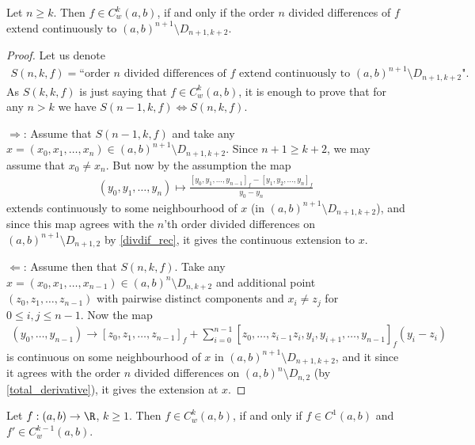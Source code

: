 \begin{lem}\label{weaklyCk_basic}
	Let $n \geq k$. Then $f \in C_{w}^{k}(a, b)$, if and only if the order $n$ divided differences of $f$ extend continuously to $(a, b)^{n + 1} \setminus D_{n + 1, k + 2}$.
\end{lem}
\begin{proof}
	Let us denote
	\begin{align*}
		S(n, k, f) = \text{``order $n$ divided differences of $f$ extend continuously to $(a, b)^{n + 1} \setminus D_{n + 1, k + 2}$"}.
	\end{align*}
	As $S(k, k, f)$ is just saying that $f \in C_{w}^{k}(a, b)$, it is enough to prove that for any $n > k$ we have $S(n - 1, k, f) \Leftrightarrow S(n, k, f)$.

	$\Rightarrow$: Assume that $S(n - 1, k, f)$ and take any $x = (x_{0}, x_{1}, \ldots, x_{n}) \in (a, b)^{n + 1} \setminus D_{n + 1, k + 2}$. Since $n + 1 \geq k + 2$, we may assume that $x_{0} \neq x_{n}$. But now by the assumption the map
	\begin{align*}
		(y_{0}, y_{1}, \ldots, y_{n}) \mapsto \frac{[y_{0}, y_{1}, \ldots, y_{n - 1}]_{f} - [y_{1}, y_{2}, \ldots, y_{n}]_{f}}{y_{0} - y_{n}}
	\end{align*}
	extends continuously to some neighbourhood of $x$ (in $(a, b)^{n + 1} \setminus D_{n + 1, k + 2}$), and since this map agrees with the $n$'th order divided differences on $(a, b)^{n + 1} \setminus D_{n + 1, 2}$ by \ref{divdif_rec}, it gives the continuous extension to $x$.

	$\Leftarrow$: Assume then that $S(n, k, f)$. Take any $x = (x_{0}, x_{1}, \ldots, x_{n - 1}) \in (a, b)^{n} \setminus D_{n, k + 2}$ and additional point $(z_{0}, z_{1}, \ldots, z_{n - 1})$ with pairwise distinct components and $x_{i} \neq z_{j}$ for $0 \leq i, j \leq n - 1$. Now the map
	\begin{align*}
		(y_{0}, \ldots, y_{n - 1}) \to [z_{0}, z_{1}, \ldots, z_{n - 1}]_{f} + \sum_{i = 0}^{n - 1}[z_{0}, \ldots, z_{i - 1} z_{i}, y_{i}, y_{i + 1}, \ldots, y_{n - 1}]_{f} (y_{i} - z_{i})
	\end{align*}
	is continuous on some neighbourhood of $x$ in $(a, b)^{n + 1} \setminus D_{n + 1, k + 2}$, and it since it agrees with the order $n$ divided differences on $(a, b)^{n} \setminus D_{n, 2}$ (by \ref{total_derivative}), it gives the extension at $x$.
\end{proof}

\begin{lause}\label{weaktoreal_lemma}
	Let $f : (a, b) \to \R$, $k \geq 1$. Then $f \in C_{w}^{k}(a, b)$, if and only if $f \in C^{1}(a, b)$ and $f' \in C_{w}^{k - 1}(a, b)$.
\end{lause}

